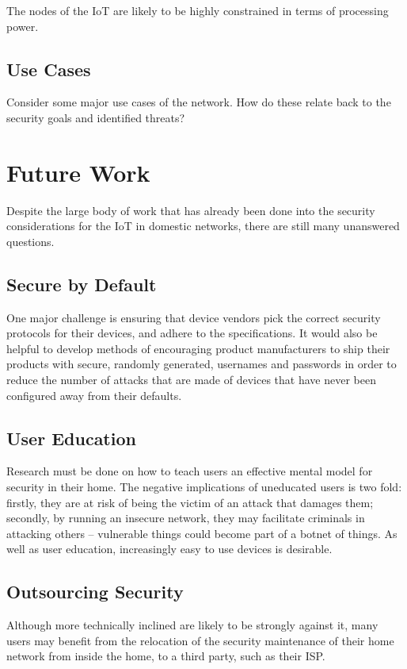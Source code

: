 \documentclass[10pt,journal,compsoc]{IEEEtran}
\begin{document}
The nodes of the IoT are likely to be highly constrained in terms of processing
power. 

\subsection{Use Cases}
Consider some major use cases of the network.
How do these relate back to the security goals and identified threats?


\section{Future Work}
Despite the large body of work that has already been done into the security
considerations for the IoT in domestic networks, there are still many
unanswered questions. 

\subsection{Secure by Default}
One major challenge is ensuring that device vendors pick the correct security
protocols for their devices, and adhere to the specifications. It would also be
helpful to develop methods of encouraging product manufacturers to ship their
products with secure, randomly generated, usernames and passwords in order to
reduce the number of attacks that are made of devices that have never been
configured away from their defaults.

\subsection{User Education}
Research must be done on how to teach users an effective mental model for
security in their home. The negative implications of uneducated users is two
fold: firstly, they are at risk of being the victim of an attack that damages
them; secondly, by running an insecure network, they may facilitate criminals
in attacking others -- vulnerable things could become part of a botnet of
things. As well as user education, increasingly easy to use devices is
desirable. 

\subsection{Outsourcing Security}
Although more technically inclined are likely to be strongly against it, many
users may benefit from the relocation of the security maintenance of their home
network from inside the home, to a third party, such as their ISP. 
\end{document}
